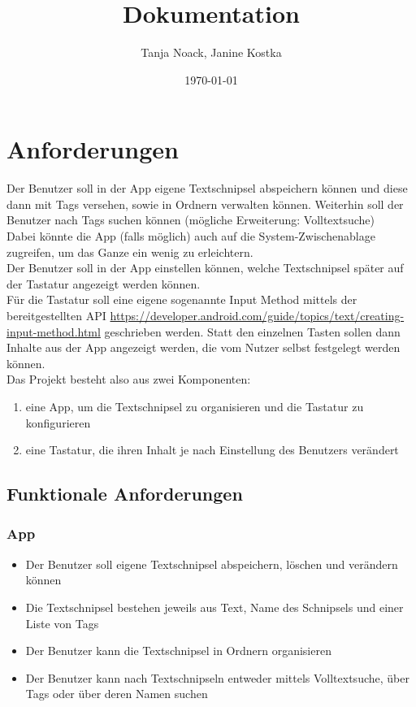 \documentclass[11pt]{article}
\title{Dokumentation}
\author{Tanja Noack, Janine Kostka}
\date{\today}
\begin{document}
\maketitle  
\pagebreak


\tableofcontents
\pagebreak


\section{Anforderungen}
	Der Benutzer soll in der App eigene Textschnipsel abspeichern können und diese dann mit Tags versehen, sowie in Ordnern verwalten können. Weiterhin soll der Benutzer nach Tags suchen können (mögliche Erweiterung: Volltextsuche) \\
	Dabei könnte die App (falls möglich) auch auf die System-Zwischenablage zugreifen, um das Ganze ein wenig zu erleichtern. \\
	Der Benutzer soll in der App einstellen können, welche Textschnipsel später auf der Tastatur angezeigt werden können. \\
	
	\noindent Für die Tastatur soll eine eigene sogenannte Input Method mittels der bereitgestellten API \sloppy\url{https://developer.android.com/guide/topics/text/creating-input-method.html} geschrieben werden. Statt den einzelnen Tasten sollen dann Inhalte aus der App angezeigt werden, die vom Nutzer selbst festgelegt werden können.\\

	Das Projekt besteht also aus zwei Komponenten:
	\begin{enumerate}
		\item eine App, um die Textschnipsel zu organisieren und die Tastatur zu konfigurieren
		\item eine Tastatur, die ihren Inhalt je nach Einstellung des Benutzers verändert
	\end{enumerate}

	\subsection{Funktionale Anforderungen}
		\subsubsection{App}
		\begin{itemize}
			\item Der Benutzer soll eigene Textschnipsel abspeichern, löschen und verändern können
			\item Die Textschnipsel bestehen jeweils aus Text, Name des Schnipsels und einer Liste von Tags
			\item Der Benutzer kann die Textschnipsel in Ordnern organisieren
			\item Der Benutzer kann nach Textschnipseln entweder mittels Volltextsuche, über Tags oder über deren Namen suchen
		\end{itemize}
	
\end{document}
